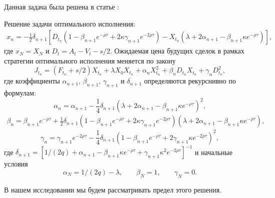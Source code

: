 Данная задача была решена в статье \cite{obizhaeva2013optimal}:
\begin{theorem}
    Решение задачи оптимального исполнения:
    \begin{multline*}
        x_n = - \frac{1}{2} \delta_{n + 1} [D_{t_n} (1 - \beta_{n + 1} e^{ - \rho \tau} + 2 \kappa \gamma_{n+1} e^{ - 2 \rho \tau}) 
         - X_{t_n} (\lambda + 2 \alpha_{n+1} - \beta_{n+1}\kappa e^{ - \rho \tau}) ], 
    \end{multline*}
    где $x_N = X_N$ и $D_t = A_t - V_t - s/2$. Ожидаемая цена будущих сделок в рамках
    стратегии оптимального исполнения меняется по закону
    \begin{equation*}
        J_{t_n} = (F_{t_n} + s/2) X_{t_n} + \lambda X_0 X_{t_n} + \alpha_n X_{t_n} ^2 + \beta_{n} D_{t_n} X_{t_n} + \gamma_n D_{t_n}^2, 
    \end{equation*}
    где коэффициенты $\alpha_{n+1}$, $\beta_{n+1}$, $\gamma_{n+1}$ и $\delta_{n+1}$ определяются рекурснивно по формулам:
    \begin{equation*}
        \alpha_{n} = \alpha_{n+1} - \frac{1}{4} \delta _{n+1} (\lambda + 2 \alpha_{n+1} - \beta_{n+1} \kappa e^{- \rho \tau})^2, 
    \end{equation*}
    \begin{multline*}
        \beta_{n} =  \beta_{n+1} e^{- \rho \tau} + \frac{1}{2} \delta _{n+1} (1 - \beta_{n+1} e^{- \rho \tau} 
         + 2 \kappa \gamma_{n+1} e^{- 2 \rho \tau}) (\lambda + 2 \alpha_{n+1} - \beta_{n+1} \kappa e^{-\rho \tau}), 
    \end{multline*}
    \begin{equation*}
         \gamma_n =   \gamma_{n+1} e^{- 2 \rho \tau} - \frac{1}{4} \delta _{n+1} (1 - \beta _{n+1} e^{- \rho \tau} 
    + 2 \gamma _{n+1} \kappa e^{- 2 \rho \tau})^2, 
    \end{equation*}
    где $\delta_{n+1} = [1/(2q) + \alpha_{n+1} - \beta_{n+1} \kappa e^{-\rho \tau} + \gamma _{n+1} \kappa ^2 e^{- 2 \rho \tau}]^{-1}$ и начальные условия
    \begin{equation*}
        \alpha_{N} = 1/(2q) - \lambda, \;\;\;\;\;\;\; \beta_N = 1, \;\;\;\;\;\;\; \gamma_N = 0.
    \end{equation*}
\end{theorem}

В нашем исследовании мы будем рассматривать предел этого решения.

